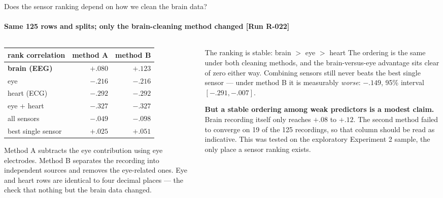\documentclass[aspectratio=169,10pt]{beamer}
\makeatletter
\newcommand{\runtag}[1]{{\scriptsize\color{mubeamer@gray7}[#1]}}
\newcommand{\sidenote}[1]{{\scriptsize\color{mubeamer@gray7}\sloppy\par#1\par}}
\makeatother
\begin{document}
\begin{frame}{Does the sensor ranking depend on how we clean the brain data?}
  \framesubtitle{Same 125 rows and splits; only the brain-cleaning method changed \runtag{Run R-022}}
  \begin{columns}[T]
    \begin{column}{0.46\textwidth}
      \scriptsize
      \begin{tabular}{@{}lrr@{}}
        \toprule
        rank correlation & method A & method B \\
        \midrule
        \textbf{brain (EEG)} & $+.080$ & $+.123$ \\
        eye              & $-.216$ & $-.216$ \\
        heart (ECG)      & $-.292$ & $-.292$ \\
        eye + heart      & $-.327$ & $-.327$ \\
        all sensors      & $-.049$ & $-.098$ \\
        best single sensor & $+.025$ & $+.051$ \\
        \bottomrule
      \end{tabular}

      \vspace{0.4em}
      \sidenote{Method A subtracts the eye contribution using eye electrodes.
      Method B separates the recording into independent sources and removes
      the eye-related ones. Eye and heart rows are identical to four decimal
      places --- the check that nothing but the brain data changed.}
    \end{column}
    \begin{column}{0.50\textwidth}
      \begin{block}{The ranking is stable: brain $>$ eye $>$ heart}
        \small
        The ordering is the same under both cleaning methods, and the
        brain-versus-eye advantage sits clear of zero either way. Combining
        sensors still never beats the best single sensor --- under method B
        it is measurably \emph{worse}: $-.149$, 95\% interval
        $[-.291, -.007]$.
      \end{block}
      \sidenote{\textbf{But a stable ordering among weak predictors is a modest
      claim.} Brain recording itself only reaches $+.08$ to $+.12$. The
      second method failed to converge on 19 of the 125 recordings, so that
      column should be read as indicative. This was tested on the exploratory
      Experiment 2 sample, the only place a sensor ranking exists.}
    \end{column}
  \end{columns}
\end{frame}
\end{document}
